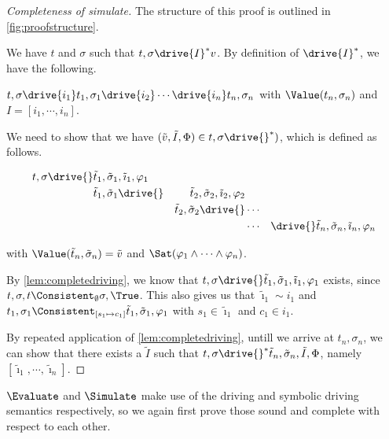 \begin{proof}[Completeness of simulate]
  The structure of this proof is outlined in \cref{fig:proofstructure}.

  We have $t$ and $\sigma$ such that $t,\sigma\drive{I}^*v$.
  By definition of $\drive{I}^*$, we have the following.

  $t,\sigma\drive{i_1}t_1,\sigma_1\drive{i_2}\cdots \drive{i_n}t_n,\sigma_n$ with $\Value(t_n,\sigma_n)$ and $I=[i_1,\cdots,i_n]$.

  We need to show that we have $(\tilde{v},\tilde{I},\Phi)\in t,\sigma\drive{}^*)$,
  which is defined as follows.

  \begin{align*}
      t,\sigma\drive{}&\tilde{t}_1,\tilde{\sigma}_1,\tilde{\imath}_1,\phi_1&\\
                      &\tilde{t}_1,\tilde{\sigma}_1\drive{}&\tilde{t}_2,\tilde{\sigma}_2,\tilde{\imath}_2,\phi_2\\
                      &                                    &\tilde{t}_2,\tilde{\sigma}_2\drive{}&\cdots&\\
                      &                                    &                                    &\cdots&
                      \drive{}\tilde{t}_n,\tilde{\sigma}_n,\tilde{\imath}_n,\phi_n
  \end{align*}

  with $\Value(\tilde{t}_n,\tilde{\sigma}_n)=\tilde{v}$ and $\Sat(\phi_1\land\cdots\land\phi_n)$.

  By \cref{lem:completedriving}, we know that $t,\sigma\drive{}\tilde{t}_1,\tilde{\sigma}_1,\tilde{\imath}_1,\phi_1$ exists,
  since $t,\sigma,t\Consistent_{\emptyset}\sigma,\True$.
  This also gives us that $\tilde{\imath}_1\sim i_1$ and $t_1,\sigma_1\Consistent_{[s_1\mapsto c_1]}\tilde{t}_1,\tilde{\sigma}_1,\phi_1$ with $s_1\in\tilde{\imath}_1$ and $c_1\in i_1$.

  By repeated application of \cref{lem:completedriving}, untill we arrive at $t_n,\sigma_n$,
  we can show that there exists a $\tilde{I}$ such that $t,\sigma\drive{}^*\tilde{t}_n,\tilde{\sigma}_n,\tilde{I},\Phi$,
  namely $[\tilde{\imath}_1,\cdots,\tilde{\imath}_n]$.

\end{proof}

$\Evaluate$ and $\Simulate$ make use of the driving and symbolic driving semantics respectively, so we again first prove those sound and complete with respect to each other.


